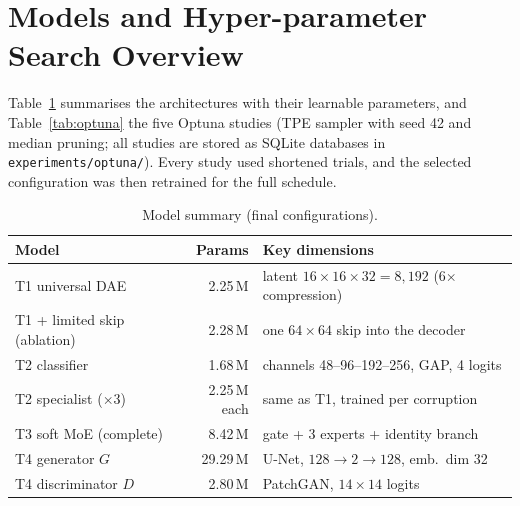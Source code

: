 \documentclass[conference]{IEEEtran}
\begin{document}
\section{Models and Hyper-parameter Search Overview}
Table~\ref{tab:models} summarises the architectures with their learnable parameters, and Table~\ref{tab:optuna} the five Optuna studies (TPE sampler with seed 42 and median pruning; all studies are stored as SQLite databases in \texttt{experiments/optuna/}). Every study used shortened trials, and the selected configuration was then retrained for the full schedule.
\begin{table}[t]\centering\caption{Model summary (final configurations).}\label{tab:models}\setlength{\tabcolsep}{3pt}\footnotesize
\begin{tabular}{p{2.6cm}rp{3.6cm}}\toprule
Model & Params & Key dimensions \\ \midrule
T1 universal DAE & 2.25\,M & latent $16{\times}16{\times}32=8{,}192$ (6$\times$ compression) \\
T1 + limited skip (ablation) & 2.28\,M & one $64{\times}64$ skip into the decoder \\
T2 classifier & 1.68\,M & channels 48--96--192--256, GAP, 4 logits \\
T2 specialist ($\times3$) & 2.25\,M each & same as T1, trained per corruption \\
T3 soft MoE (complete) & 8.42\,M & gate + 3 experts + identity branch \\
T4 generator $G$ & 29.29\,M & U-Net, $128\rightarrow2\rightarrow128$, emb.\ dim 32 \\
T4 discriminator $D$ & 2.80\,M & PatchGAN, $14{\times}14$ logits \\ \bottomrule
\end{tabular}\end{table}
\end{document}
